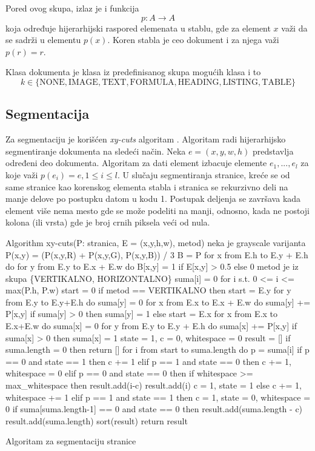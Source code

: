 \documentclass[]{amsart}
\begin{document}
Pored ovog skupa, izlaz je i funkcija $$ p : A \to A $$ koja određuje hijerarhijski raspored elemenata u stablu, gde za element $ x $ važi da se
sadrži u elementu $ p(x) $. Koren stabla je ceo dokument i za njega važi $ p(r) = r $.

Klasa dokumenta je klasa iz predefinisanog skupa mogućih klasa i to $$ k \in \{\text{NONE}, \text{IMAGE}, \text{TEXT}, \text{FORMULA}, \text{HEADING}, \text{LISTING}, \text{TABLE}\} $$ 



\subsection{Segmentacija}
\label{sec:org7eee69b}

Za segmentaciju je korišćen \textit{xy-cuts} algoritam \cite{ha1995recursive}. Algoritam radi hijerarhijsko segmentiranje dokumenta na sledeći način. Neka $ e = (x,y,w,h) $ predstavlja određeni
deo dokumenta. Algoritam za dati element izbacuje elemente $ e_1, ..., e_l $ za koje važi $ p(e_i) = e, 1 \le i \le l $. U slučaju segmentiranja stranice, kreće se od same stranice kao korenskog elementa
stabla i stranica se rekurzivno deli na manje delove po postupku datom u kodu 1. Postupak deljenja se završava kada element više nema mesto gde se može podeliti na manji, odnosno, kada ne postoji kolona (ili vrsta) gde je broj crnih piksela veći od nula.


\begin{program}
	\begin{CodeListing}
Algorithm xy-cuts(P: stranica, E = (x,y,h,w), metod)
	neka je grayscale varijanta 
		P(x,y) = (P(x,y,R) + P(x,y,G), P(x,y,B)) / 3 
	B = P
	for x from E.h to E.y + E.h do
		for y from E.y to E.x + E.w do
			B[x,y] = 1 if E[x,y] > 0.5 else 0 
	metod je iz skupa \{VERTIKALNO, HORIZONTALNO\}
	suma[i] = 0 for i s.t. 0 <= i <= max(P.h, P.w)
	start = 0 
	if metod == VERTIKALNO then 
		start = E.y
		for y from E.y to E.y+E.h do
			suma[y] = 0
			for x from E.x to E.x + E.w do
				suma[y] += P[x,y]
			if suma[y] > 0 then suma[y] = 1
	else
		start = E.x
		for x from E.x to E.x+E.w do
			suma[x] = 0
			for y from E.y to E.y + E.h do
				suma[x] += P[x,y]
			if suma[x] > 0 then suma[x] = 1
	state = 1, c = 0, whitespace = 0
	result = []
	if suma.length = 0 then return []
	for i from start to suma.length do
		p = suma[i]
		if p == 0 and state == 1 then c += 1 
		elif p == 1 and state == 0 then 
			c += 1, whitespace = 0
		elif p == 0 and state == 0 then 
			if whitespace >= max_whitespace then 
				result.add(i-c)
				result.add(i)
				c = 1, state = 1 
			else
				c += 1, whitespace += 1
		elif p == 1 and state == 1 then 
			c = 1, state = 0, whitespace = 0
	if suma[suma.length-1] == 0 and state == 0 then 
		result.add(suma.length - c)
		result.add(suma.length)
	sort(result)
	return result 
	\end{CodeListing}
	\caption{Algoritam za segmentaciju stranice}
\end{program}
\end{document}
